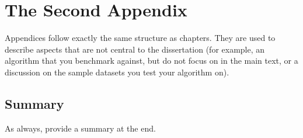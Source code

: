 
\chapter{The Second Appendix}
\label{app:appendix2}


Appendices follow exactly the same structure as chapters. They are used to describe aspects that are not central to the dissertation (for example, an algorithm that you benchmark against, but do not focus on in the main text, or a discussion on the sample datasets you test your algorithm on).


\section{Summary}
\label{sec:appendix2:summary}

As always, provide a summary at the end.

